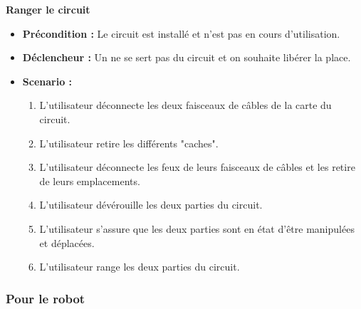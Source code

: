 		\textbf{Ranger le circuit}
		\begin{itemize}
			\item \textbf{Précondition :} Le circuit est installé et n'est pas en cours d'utilisation.
			\item \textbf{Déclencheur :} Un ne se sert pas du circuit et on souhaite libérer la place.
			\item \textbf{Scenario :}
			\begin{enumerate}
				\item L'utilisateur déconnecte les deux faisceaux de câbles de la carte du circuit.
				\item L'utilisateur retire les différents "caches".
				\item L'utilisateur déconnecte les feux de leurs faisceaux de câbles et les retire de leurs emplacements.
				\item L'utilisateur dévérouille les deux parties du circuit.
				\item L'utilisateur s'assure que les deux parties sont en état d'être manipulées et déplacées.
				\item L'utilisateur range les deux parties du circuit.
			\end{enumerate}
		\end{itemize}

	\subsubsection{Pour le robot}


